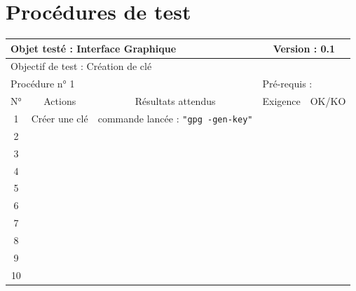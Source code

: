 \documentclass{../res/univ-projet}
\begin{document}
\section{Procédures de test}

\begin{center}
    \begin{tabular}{|c|p{5cm}|p{5cm}|p{1.5cm}|p{1.5cm}|}
      \hline
      \multicolumn{3}{|l|}{Objet testé : Interface Graphique} & \multicolumn{2}{c|}{Version : 0.1}\\ \hline
      \multicolumn{5}{|l|}{Objectif de test : Création de clé}\\ \hline
      \multicolumn{3}{|l|}{Procédure n° 1} & \multicolumn{2}{p{3cm}|}{Pré-requis : }\\ \hline
      \multicolumn{1}{|c|}{N°} & \multicolumn{1}{c|}{Actions} & \multicolumn{1}{c|}{Résultats attendus} & 
      \multicolumn{1}{c|}{Exigence} & \multicolumn{1}{c|}{OK/KO}\\ \hline
      1 & Créer une clé & commande lancée : \texttt{"gpg -\-gen-key"} &  & \\
      2 &  &  &  & \\
      3 &  &  &  & \\ 
      4 &  &  &  & \\
      5 &  &  &  & \\
      6 &  &  &  & \\
      7 &  &  &  & \\
      8 &  &  &  & \\
      9 &  &  &  & \\
      10 &  &  &  &\\ 
	\hline
    \end{tabular}
    \vskip 2.2cm




\end{center}
\end{document}
